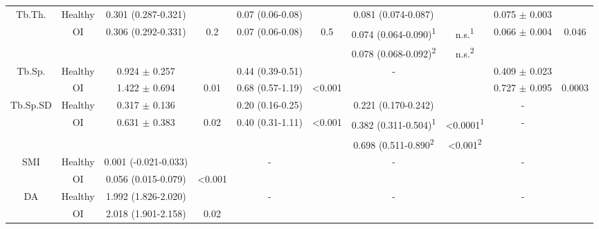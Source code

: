 \documentclass[a4paper,fleqn]{DC_ArtStyle}
\begin{document}
\begin{sidewaystable*}
{\begin{tabular}{cccccccccc}
				\multirow{3}{*}{Tb.Th.} & Healthy & 0.301 (0.287-0.321) & & 0.07 (0.06-0.08) & & 0.081 (0.074-0.087) & & 0.075 $\pm$ 0.003 & \\
				& \multirow{2}{*}{OI} & \multirow{2}{*}{0.306 (0.292-0.331)} & \multirow{2}{*}{0.2} & \multirow{2}{*}{0.07 (0.06-0.08)} & \multirow{2}{*}{0.5} & 0.074 (0.064-0.090)\textsuperscript{1} & n.s.\textsuperscript{1} & \multirow{2}{*}{0.066 $\pm$ 0.004} & \multirow{2}{*}{0.046}\\
				& & & & & & 0.078 (0.068-0.092)\textsuperscript{2} & n.s.\textsuperscript{2} & & \\[3ex]
				
				\multirow{3}{*}{Tb.Sp.} & Healthy & 0.924 $\pm$ 0.257 & & 0.44 (0.39-0.51) & & \multirow{3}{*}{-} & & 0.409 $\pm$ 0.023 & \\
				& \multirow{2}{*}{OI} & \multirow{2}{*}{1.422 $\pm$ 0.694} & \multirow{2}{*}{0.01} & \multirow{2}{*}{0.68 (0.57-1.19)} & \multirow{2}{*}{<0.001} & &  & \multirow{2}{*}{0.727 $\pm$ 0.095} & \multirow{2}{*}{0.0003}\\
				& & & & & & & & & \\[3ex]
				
				\multirow{3}{*}{Tb.Sp.SD} & Healthy & 0.317 $\pm$ 0.136 & & 0.20 (0.16-0.25) & & 0.221 (0.170-0.242) & & - &  \\
				& \multirow{2}{*}{OI} & \multirow{2}{*}{0.631 $\pm$ 0.383} & \multirow{2}{*}{0.02} & \multirow{2}{*}{0.40 (0.31-1.11)} & \multirow{2}{*}{<0.001} & 0.382 (0.311-0.504)\textsuperscript{1} & <0.0001\textsuperscript{1} & - & \\
				& & & & & & 0.698 (0.511-0.890\textsuperscript{2} & <0.001\textsuperscript{2} & & \\[3ex]
				
				\multirow{3}{*}{SMI} & Healthy & 0.001 (-0.021-0.033) & & \multirow{3}{*}{-} &  & \multirow{3}{*}{-} & & \multirow{3}{*}{-} &  \\
				& \multirow{2}{*}{OI} & \multirow{2}{*}{0.056 (0.015-0.079)} & \multirow{2}{*}{<0.001} & & & &  & & \\
				& & & & & & & & & \\[3ex]
				
				\multirow{3}{*}{DA} & Healthy & 1.992 (1.826-2.020) & & \multirow{3}{*}{-} & & \multirow{3}{*}{-} & & \multirow{3}{*}{-} &  \\
				& \multirow{2}{*}{OI} & \multirow{2}{*}{2.018 (1.901-2.158)} & \multirow{2}{*}{0.02} & & & & & & \\
				& & & & & & & & & \\[3ex]
				

\end{tabular}}
\end{sidewaystable*}
\end{document}
